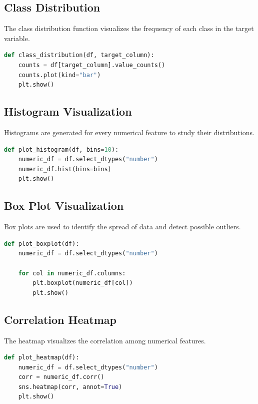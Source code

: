 \documentclass[12pt,a4paper]{article}
\begin{document}
\subsection{Class Distribution}

The class distribution function visualizes the frequency of each class in the
target variable.

\begin{lstlisting}[language=Python,caption={Class Distribution}]
def class_distribution(df, target_column):
    counts = df[target_column].value_counts()
    counts.plot(kind="bar")
    plt.show()
\end{lstlisting}


\subsection{Histogram Visualization}

Histograms are generated for every numerical feature to study their
distributions.

\begin{lstlisting}[language=Python,caption={Histogram Plot}]
def plot_histogram(df, bins=10):
    numeric_df = df.select_dtypes("number")
    numeric_df.hist(bins=bins)
    plt.show()
\end{lstlisting}


\subsection{Box Plot Visualization}

Box plots are used to identify the spread of data and detect possible outliers.

\begin{lstlisting}[language=Python,caption={Box Plot}]
def plot_boxplot(df):
    numeric_df = df.select_dtypes("number")

    for col in numeric_df.columns:
        plt.boxplot(numeric_df[col])
        plt.show()
\end{lstlisting}


\subsection{Correlation Heatmap}

The heatmap visualizes the correlation among numerical features.

\begin{lstlisting}[language=Python,caption={Correlation Heatmap}]
def plot_heatmap(df):
    numeric_df = df.select_dtypes("number")
    corr = numeric_df.corr()
    sns.heatmap(corr, annot=True)
    plt.show()
\end{lstlisting}
\end{document}
